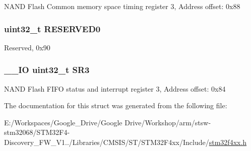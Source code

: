 N\-A\-N\-D Flash Common memory space timing register 3, Address offset\-: 0x88 \hypertarget{struct_f_s_m_c___bank3___type_def_af86c61a5d38a4fc9cef942a12744486b}{
\subsubsection[{R\-E\-S\-E\-R\-V\-E\-D0}]{\setlength{\rightskip}{0pt plus 5cm}uint32\-\_\-t R\-E\-S\-E\-R\-V\-E\-D0}}\label{struct_f_s_m_c___bank3___type_def_af86c61a5d38a4fc9cef942a12744486b}
Reserved, 0x90 \hypertarget{struct_f_s_m_c___bank3___type_def_af30c34f7c606cb9416a413ec5fa36491}{
\subsubsection[{S\-R3}]{\setlength{\rightskip}{0pt plus 5cm}\-\_\-\-\_\-\-I\-O uint32\-\_\-t S\-R3}}\label{struct_f_s_m_c___bank3___type_def_af30c34f7c606cb9416a413ec5fa36491}
N\-A\-N\-D Flash F\-I\-F\-O status and interrupt register 3, Address offset\-: 0x84 

The documentation for this struct was generated from the following file\-:\begin{DoxyCompactItemize}
\item 
E\-:/\-Workspaces/\-Google\-\_\-\-Drive/\-Google Drive/\-Workshop/arm/stsw-\/stm32068/\-S\-T\-M32\-F4-\/\-Discovery\-\_\-\-F\-W\-\_\-\-V1../\-Libraries/\-C\-M\-S\-I\-S/\-S\-T/\-S\-T\-M32\-F4xx/\-Include/\hyperlink{stm32f4xx_8h}{stm32f4xx.\-h}\end{DoxyCompactItemize}
